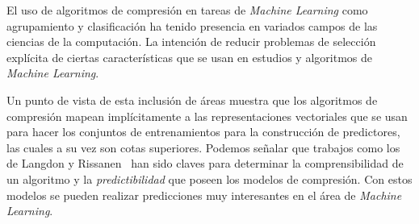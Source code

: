 







El uso de algoritmos de compresión en tareas de \emph{Machine Learning} como agrupamiento y clasificación ha tenido presencia en variados campos de las ciencias de la computación. La intención de reducir problemas de selección explícita de ciertas características que se usan en estudios y algoritmos de \emph{Machine Learning}.


Un punto de vista de esta inclusión de áreas muestra que los algoritmos de compresión mapean implícitamente a las representaciones vectoriales que se usan para hacer los conjuntos de entrenamientos para la construcción de predictores, las cuales a su vez son cotas superiores. Podemos señalar que  trabajos como los de Langdon y Rissanen~\cite{RissanenLangdon1979} han sido claves para determinar la comprensibilidad de un algoritmo y la \emph{predictibilidad} que poseen los modelos de compresión. Con estos modelos se pueden realizar predicciones muy interesantes en el área de \emph{Machine Learning}.















